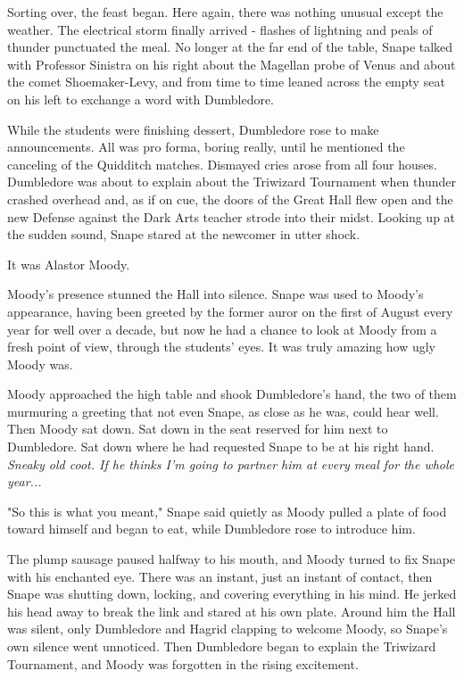 Sorting over, the feast began. Here again, there was nothing unusual except the weather. The electrical storm finally arrived - flashes of lightning and peals of thunder punctuated the meal. No longer at the far end of the table, Snape talked with Professor Sinistra on his right about the Magellan probe of Venus and about the comet Shoemaker-Levy, and from time to time leaned across the empty seat on his left to exchange a word with Dumbledore.

While the students were finishing dessert, Dumbledore rose to make announcements. All was pro forma, boring really, until he mentioned the canceling of the Quidditch matches. Dismayed cries arose from all four houses. Dumbledore was about to explain about the Triwizard Tournament when thunder crashed overhead and, as if on cue, the doors of the Great Hall flew open and the new Defense against the Dark Arts teacher strode into their midst. Looking up at the sudden sound, Snape stared at the newcomer in utter shock.

It was Alastor Moody.

Moody's presence stunned the Hall into silence. Snape was used to Moody's appearance, having been greeted by the former auror on the first of August every year for well over a decade, but now he had a chance to look at Moody from a fresh point of view, through the students' eyes. It was truly amazing how ugly Moody was.

Moody approached the high table and shook Dumbledore's hand, the two of them murmuring a greeting that not even Snape, as close as he was, could hear well. Then Moody sat down. Sat down in the seat reserved for him next to Dumbledore. Sat down where he had requested Snape to be at his right hand. \emph{Sneaky old coot. If he thinks I'm going to partner him at every meal for the whole year...}

"So this is what you meant," Snape said quietly as Moody pulled a plate of food toward himself and began to eat, while Dumbledore rose to introduce him.

The plump sausage paused halfway to his mouth, and Moody turned to fix Snape with his enchanted eye. There was an instant, just an instant of contact, then Snape was shutting down, locking, and covering everything in his mind. He jerked his head away to break the link and stared at his own plate. Around him the Hall was silent, only Dumbledore and Hagrid clapping to welcome Moody, so Snape's own silence went unnoticed. Then Dumbledore began to explain the Triwizard Tournament, and Moody was forgotten in the rising excitement.

